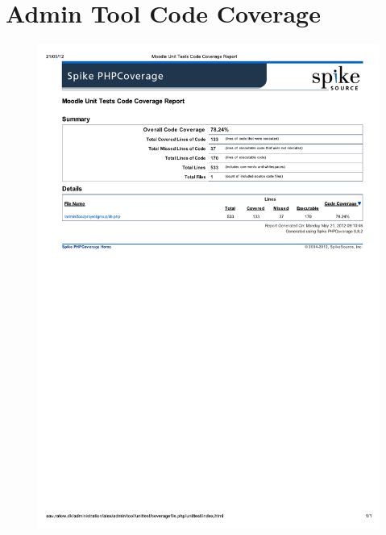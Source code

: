 \chapter{Admin Tool Code Coverage}
\label{app:admincc}
\begin{figure}
	\centering
		\includegraphics{images/adminprojectgroupccreport.pdf}
	\label{fig:adminprojectgroupccreport}
\end{figure}

